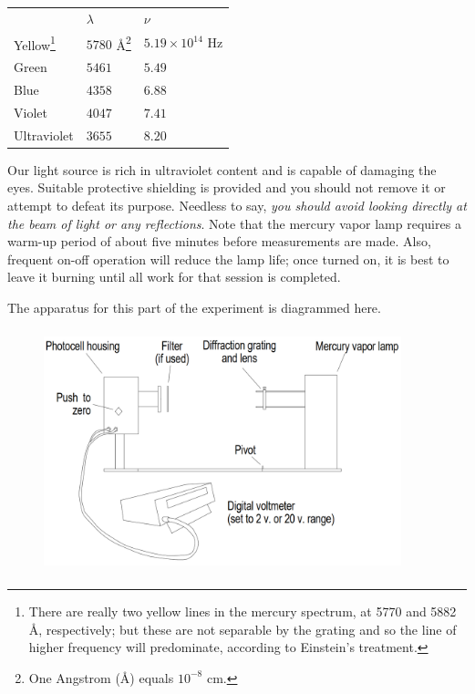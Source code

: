 \begin{minipage}{0.95\textwidth}
\centering
\begin{tabular}{ l l l }
 & $\lambda$ & $\nu$\\
Yellow\footnote{There are really two yellow lines in the mercury
  spectrum, at 5770 and 5882 Å, respectively; but these are not
  separable by the grating and so the line of higher frequency will
  predominate, according to Einstein's treatment.}
  & $5780$ {\small Å}\footnote{One Angstrom (Å) equals $10^{-8}$ cm.}
  & $5.19\times 10^{14}$ Hz\\

Green & $5461$ & $5.49$\\

Blue & $4358$ & $6.88$\\

Violet & $4047$ &$7.41$\\

Ultraviolet & $3655$ & $8.20$\\

\end{tabular}
\end{minipage}

\medskip

Our light source is rich in ultraviolet content and is capable of
damaging the eyes. Suitable protective shielding is provided and you
should not remove it or attempt to defeat its purpose. Needless to say,
\emph{you should avoid looking directly at the beam of light or any
reflections}. Note that the mercury vapor lamp requires a warm-up period
of about five minutes before measurements are made. Also, frequent
on-off operation will reduce the lamp life; once turned on, it is best
to leave it burning until all work for that session is completed.

The apparatus for this part of the experiment is diagrammed here.
\begin{figure}[h]
  \begin{center}
  \includegraphics[width=4.08333in,height=2.77083in]{images/06_einstein/003.png}
  \end{center}
\end{figure}


